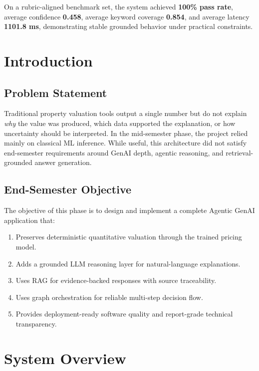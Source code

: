 \documentclass[12pt,a4paper]{article}
\begin{document}
On a rubric-aligned benchmark set, the system achieved \textbf{100\% pass rate}, average confidence \textbf{0.458}, average keyword coverage \textbf{0.854}, and average latency \textbf{1101.8 ms}, demonstrating stable grounded behavior under practical constraints.

\section{Introduction}
\subsection{Problem Statement}
Traditional property valuation tools output a single number but do not explain \emph{why} the value was produced, which data supported the explanation, or how uncertainty should be interpreted. In the mid-semester phase, the project relied mainly on classical ML inference. While useful, this architecture did not satisfy end-semester requirements around GenAI depth, agentic reasoning, and retrieval-grounded answer generation.

\subsection{End-Semester Objective}
The objective of this phase is to design and implement a complete Agentic GenAI application that:
\begin{enumerate}[leftmargin=1.8em]
  \item Preserves deterministic quantitative valuation through the trained pricing model.
  \item Adds a grounded LLM reasoning layer for natural-language explanations.
  \item Uses RAG for evidence-backed responses with source traceability.
  \item Uses graph orchestration for reliable multi-step decision flow.
  \item Provides deployment-ready software quality and report-grade technical transparency.
\end{enumerate}

\section{System Overview}
\end{document}
